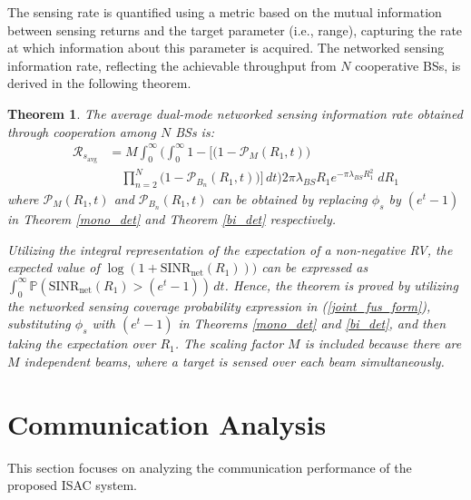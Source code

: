 \documentclass[journal]{IEEEtran}
\newtheorem{theorem}{\textbf{Theorem}}
\begin{document}
The sensing rate is quantified using a metric based on the mutual information between sensing returns and the target parameter (i.e., range), capturing the rate at which information about this parameter is acquired. The networked sensing information rate, reflecting the achievable throughput from \( N \) cooperative BSs, is derived in the following theorem.
\begin{theorem} \label{ses_rate}
The average dual-mode networked sensing information rate obtained through cooperation among \( N \) BSs is:
\begin{equation}
\begin{aligned}
\mathcal{R}_{s_{\text{avg}}}&=M\int_0^\infty\bigg(\int_0^\infty 1 - \bigg[\big(1 - \mathcal{P}_M(R_1,t)\big)\\
& \quad \prod_{n=2}^{N} \big(1 - \mathcal{P}_{B_n}(R_1,t)\big)\bigg] \, dt\bigg)
 2 \pi \lambda_{BS} R_1 e^{-\pi \lambda_{BS} R_1^2} \; dR_1
\end{aligned}
\end{equation}
where $\mathcal{P}_M (R_1,t)$ and $\mathcal{P}_{B_n} (R_1,t)$ can be obtained by replacing $\phi_s$ by $( e^t - 1)$ in Theorem \ref{mono_det} and Theorem \ref{bi_det} respectively. 
\begin{IEEEproof}
Utilizing the integral representation of the expectation of a non-negative RV, the expected value of \(\log(1 + \text{SINR}_{\text{net}}(R_1)))\) can be expressed as 
$ \int_0^\infty \mathbb{P}( \text{SINR}_{\text{net}}(R_1) >( e^t - 1)) \, dt$.
Hence, the theorem is proved by utilizing the networked sensing coverage probability expression in (\ref{joint_fus_form}), substituting \(\phi_s\) with \((e^t - 1)\) in Theorems \ref{mono_det} and \ref{bi_det}, and then taking the expectation over \( R_1 \). The scaling factor \( M \) is included because there are \( M \) independent beams, where a target is sensed over each beam simultaneously.
\end{IEEEproof}
\end{theorem}








\section{Communication Analysis}\label{ana_commm}

This section focuses on analyzing the communication performance of the proposed ISAC system.
\end{document}
